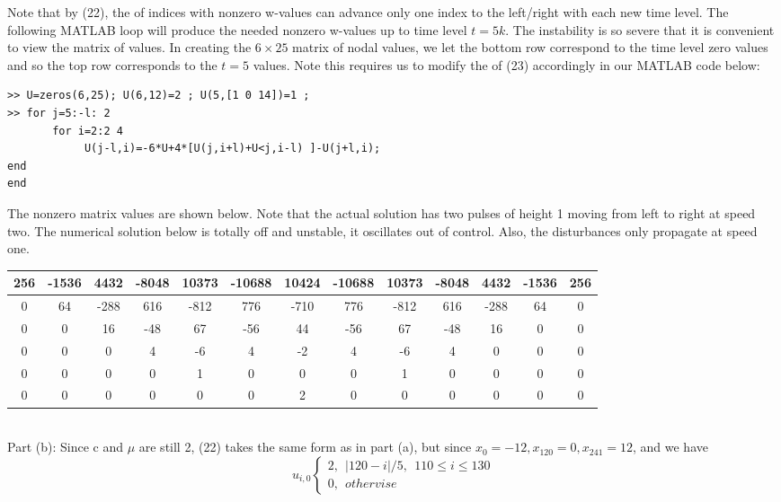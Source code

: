 \documentclass[../main.tex]{subfiles}
\begin{document}
Note that by (22), the of indices with nonzero w-values can advance only one index to the left/right with each new time level. The following MATLAB loop will produce the needed nonzero w-values up to time level $t = 5k$. The instability is so severe that it is  convenient to view the matrix of values. In creating the $6\times 25$ matrix of nodal values, we let the bottom row correspond to the time level zero values and so the top row corresponds to the $t = 5$ values. Note this requires us to modify the of (23) accordingly in our MATLAB code below: 
\begin{lstlisting}[numbers=none,frame=none]
>> U=zeros(6,25); U(6,12)=2 ; U(5,[1 0 14])=1 ; 
>> for j=5:-l: 2 
	   for i=2:2 4 
		    U(j-l,i)=-6*U+4*[U(j,i+l)+U<j,i-l) ]-U(j+l,i);
end 
end 
\end{lstlisting}
The nonzero matrix values are shown below. Note that the actual solution has two 
pulses of height 1 moving from left to right at speed two. The numerical solution 
below is totally off and unstable, it oscillates out of control. Also, the disturbances 
only propagate at speed one. \\
\begin{table}[!ht]
    \centering
    \begin{tabular}{|c|c|c|c|c|c|c|c|c|c|c|c|c|}
    \hline
        256 & -1536 & 4432 & -8048 & 10373 & -10688 & 10424 & -10688 & 10373 & -8048 &4432 & -1536 & 256 \\ \hline
        0 & 64 & -288 & 616 & -812 & 776 & -710 & 776 & -812 & 616 &-288 & 64 & 0\\ \hline
        0 & 0 & 16 & -48 & 67 & -56 & 44 & -56 & 67 & -48 & 16 & 0 & 0\\ \hline
        0 & 0 & 0 & 4 & -6 & 4 & -2 & 4 & -6 & 4 & 0 & 0 & 0 \\ \hline
        0 & 0 & 0 & 0 & 1 & 0 & 0 & 0 & 1 & 0 & 0 & 0 & 0\\ \hline
        0 & 0 & 0 & 0 & 0 & 0 & 2 & 0 & 0 & 0 & 0 & 0 & 0\\ \hline
    \end{tabular}
\end{table}
\\
Part (b): Since c and $ \mu$ are still 2, (22) takes the same form as in part (a), but 
since $x_0 = -12, x_{120} = 0, x_{241} = 12$, and we have
$$u_{i,0}
	\begin{cases}
		2, ~~\vert 120-i\vert /5, ~~ 110 \leqslant i \leqslant 130\\
		0, ~~othervise
	\end{cases}$$
\end{document}
